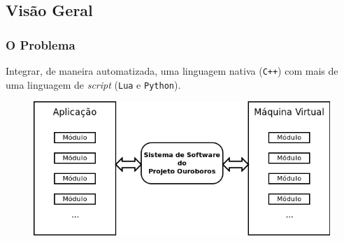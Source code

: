 \documentclass[brazil]{beamer}
\begin{document}
\subsection{Visão Geral}
\begin{frame}[fragile]
  \frametitle{O Problema}
  \pause
  \begin{block}{}
    Integrar, de maneira automatizada, uma linguagem nativa (\texttt{C++}) com
    mais de uma linguagem de \textit{script} (\texttt{Lua} e \texttt{Python}).
  \end{block}
  \pause
  \begin{figure}
    \includegraphics[width=.7\textwidth]{images/overview-simple.png}
  \end{figure}
\end{frame}
\end{document}
